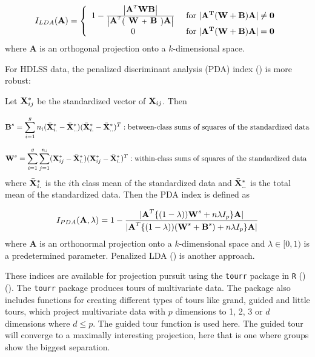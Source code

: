 $$
I_{LDA}(\hbox{\bf{A}}) = \left\{ \begin{array}{cc}
 1 - \frac{\left|\hbox{\textbf{A}}^T \hbox{\bf{W}} \hbox{\bf{B}}\right|}{\left|\hbox{\bf{A}}^T \left(\hbox{\textbf{ W }} + \hbox{\textbf{ B }}\right)\hbox{\textbf{A}}\right|} &\mbox{ for $|\bf{A}^T(\bf{W} + \bf{B})\bf{A}| \neq 0$} \\
 0 &\mbox{ for $|\bf{A}^T(\bf{W} + \bf{B})\bf{A}| = 0$}
       \end{array} \right.
$$
where \textbf{A} is an orthogonal projection onto a $k$-dimensional space.

For HDLSS data, the penalized discriminant analysis (PDA) index (\cite{lee:2009}) is more robust:

Let ${\bf{X}}_{ij}^*$ be the standardized vector of ${\bf{X}}_{ij}$. Then 

$$
\hbox{\bf{B}}^s = \sum_{i=1}^g n_i (\bar{\bf{X}}_{i.}^* - \bar{\bf{X}}_{..}^*)(\bar{\bf{X}}_{i.}^* - \bar{\bf{X}}_{..}^*)^T : \hbox{between-class sums of squares of the standardized data}
$$

$$\hbox{\bf{W}}^s = \sum_{i=1}^g \sum_{j=1}^{n_i} ({\bf{X}}_{ij}^* - \bar{{\bf{X}}}_{i.}^*)({{\bf{X}}_{ij}^*} - \bar{\bf{X}}_{i.}^*)^T : \hbox{within-class sums of squares of the standardized data }$$
where $\bar{{\bf{X}}}_{i.}^*$ is the $i$th class mean of the standardized data and $\bar{\bf{X}}_{..}^*$ is the total mean of the standardized data. Then the PDA index is defined as

$$I_{PDA}(\hbox{\bf{A}},  \lambda) = 1 - \frac{|\hbox{\bf{A}}^T\{(1 - \lambda))\hbox{\bf{W}}^s + n\lambda I_p\}\hbox{\bf{A}}|}{|\hbox{\bf{A}}^T\{(1 - \lambda))(\hbox{\bf{W}}^s + \hbox{\bf{B}}^s) + n\lambda I_p\}\hbox{\bf{A}}|}$$
where \textbf{A} is an orthonormal projection onto a $k$-dimensional space and $\lambda \in [0, 1)$ is a predetermined parameter. Penalized LDA (\cite{witten:2011}) is another approach.

These indices are available for projection pursuit using the \texttt{tourr} package in \texttt{R} (\cite{r}) (\cite{WC08}). The \texttt{tourr} package produces tours of multivariate data. The package also includes functions for creating different types of tours like grand, guided and little tours, which project multivariate data with $p$ dimensions to 1, 2, 3 or $d$ dimensions where $d \le p$. The guided tour function is used here. The guided tour will converge to a maximally interesting projection, here that is one where groups show the biggest separation.     


